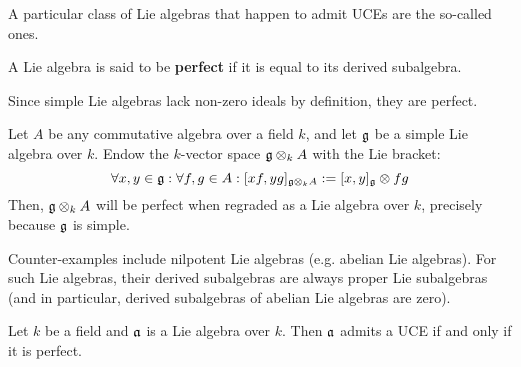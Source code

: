         A particular class of Lie algebras that happen to admit UCEs are the so-called  ones.
        \begin{definition}
            A Lie algebra is said to be \textbf{perfect} if it is equal to its derived subalgebra. 
        \end{definition}
        \begin{example}
            Since simple Lie algebras lack non-zero ideals by definition, they are perfect. 
        \end{example}
        \begin{example}
            Let $A$ be any commutative algebra over a field $k$, and let $\mathfrak{g}$ be a simple Lie algebra over $k$. Endow the $k$-vector space $\g \tensor_k A$ with the Lie bracket:
                $$\forall x, y \in \g: \forall f, g \in A: [x f, y g]_{\g \tensor_k A} := [x, y]_{\g} \tensor fg$$
            Then, $\g \tensor_k A$ will be perfect when regraded as a Lie algebra over $k$, precisely because $\mathfrak{g}$ is simple.
        \end{example}
        \begin{example}
            Counter-examples include nilpotent Lie algebras (e.g. abelian Lie algebras). For such Lie algebras, their derived subalgebras are always proper Lie subalgebras (and in particular, derived subalgebras of abelian Lie algebras are zero). 
        \end{example}
        \begin{proposition} \label{prop: perfect_lie_algebras_admit_UCEs}
            \cite[Lemma 1.10]{garland_arithmetics_of_loop_groups} Let $k$ be a field and $\mathfrak{a}$ is a Lie algebra over $k$. Then $\mathfrak{a}$ admits a UCE if and only if it is perfect.
        \end{proposition}